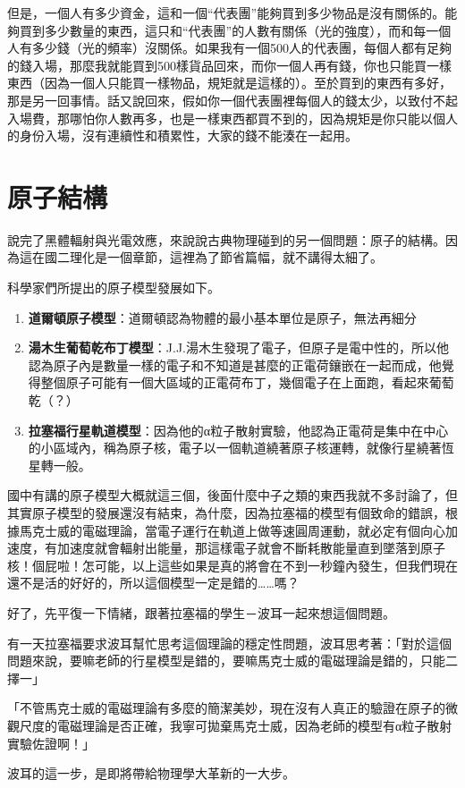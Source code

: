 {\Kai 但是，一個人有多少資金，這和一個“代表團”能夠買到多少物品是沒有關係的。能夠買到多少數量的東西，這只和“代表團”的人數有關係（光的強度），而和每一個人有多少錢（光的頻率）沒關係。如果我有一個500人的代表團，每個人都有足夠的錢入場，那麼我就能買到500樣貨品回來，而你一個人再有錢，你也只能買一樣東西（因為一個人只能買一樣物品，規矩就是這樣的）。至於買到的東西有多好，那是另一回事情。話又說回來，假如你一個代表團裡每個人的錢太少，以致付不起入場費，那哪怕你人數再多，也是一樣東西都買不到的，因為規矩是你只能以個人的身份入場，沒有連續性和積累性，大家的錢不能湊在一起用。}
\section{原子結構}
說完了黑體輻射與光電效應，來說說古典物理碰到的另一個問題：原子的結構。因為這在國二理化是一個章節，這裡為了節省篇幅，就不講得太細了。

科學家們所提出的原子模型發展如下。
\begin{enumerate}
\item \textbf{道爾頓原子模型}：道爾頓認為物體的最小基本單位是原子，無法再細分
\item \textbf{湯木生葡萄乾布丁模型}：J.J.湯木生發現了電子，但原子是電中性的，所以他認為原子內是數量一樣的電子和不知道是甚麼的正電荷鑲嵌在一起而成，他覺得整個原子可能有一個大區域的正電荷布丁，幾個電子在上面跑，看起來葡萄乾（？）
\item \textbf{拉塞福行星軌道模型}：因為他的α粒子散射實驗，他認為正電荷是集中在中心的小區域內，稱為原子核，電子以一個軌道繞著原子核運轉，就像行星繞著恆星轉一般。
\end{enumerate}
國中有講的原子模型大概就這三個，後面什麼中子之類的東西我就不多討論了，但其實原子模型的發展還沒有結束，為什麼，因為拉塞福的模型有個致命的錯誤，根據馬克士威的電磁理論，當電子運行在軌道上做等速圓周運動，就必定有個向心加速度，有加速度就會輻射出能量，那這樣電子就會不斷耗散能量直到墜落到原子核！個屁啦！怎可能，以上這些如果是真的將會在不到一秒鐘內發生，但我們現在還不是活的好好的，所以這個模型一定是錯的……嗎？

好了，先平復一下情緒，跟著拉塞福的學生－波耳一起來想這個問題。

有一天拉塞福要求波耳幫忙思考這個理論的穩定性問題，波耳思考著：「對於這個問題來說，要嘛老師的行星模型是錯的，要嘛馬克士威的電磁理論是錯的，只能二擇一」
	
「不管馬克士威的電磁理論有多麼的簡潔美妙，現在沒有人真正的驗證在原子的微觀尺度的電磁理論是否正確，我寧可拋棄馬克士威，因為老師的模型有α粒子散射實驗佐證啊！」

波耳的這一步，是即將帶給物理學大革新的一大步。
